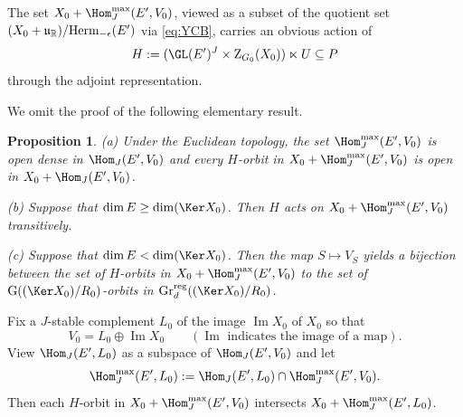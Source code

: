\documentclass[11pt,a4paper]{amsart}
\def\Im{\operatorname{Im}}
\newcommand{\R}{\mathbb R}
\newcommand{\la}{\langle}
\newcommand{\ra}{\rangle}
\newcommand{\be}{\begin {equation}}
\newcommand{\ee}{\end {equation}}
\numberwithin{equation}{section}
\newtheorem{prop}[thm]{Proposition}
\theoremstyle{remark}
\def\subset{\subseteq}
\begin{document}

The set $X_0+ \Hom_J^{\max}(E',V_0)$,  viewed as a subset of the  quotient set  $(X_0+\frak u_\R)/\mathrm{Herm}_{-\epsilon}(E')$ via \eqref{eq:YCB}, carries an obvious action of 
\[
H:= (\GL(E')^J\times \mathrm Z_{G_0}(X_0))\ltimes U\subset P
\]
through the adjoint representation. 




We omit the proof of the following elementary result. 
\begin{prop}\label{prop:A4}
 \noindent (a) Under the Euclidean topology, the set $\Hom_J^{\max}(E',V_0)$ is open dense in $\Hom_J(E',V_0)$  and  every $H$-orbit  in $X_0+\Hom_J^{\max}(E',V_0)$  is open in $X_0+\Hom_J(E',V_0)$. 
 
 \noindent (b) Suppose that $\dim E \geq \dim (\Ker X_0)$. Then $H$ acts on $X_0+\Hom_J^{\max}(E',V_0)$ transitively. 
 
 \noindent (c) Suppose that $\dim E < \dim (\Ker X_0)$. 
 Then the map $S\mapsto V_S$ yields a bijection between the set of $H$-orbits
 in $X_0+\Hom_J^{\max}(E',V_0)$ to the set of  $\mathrm{G}((\Ker X_0)/R_0)$-orbits in $\mathrm{Gr}_{d}^{\mathrm{reg}} ((\Ker X_0)/R_0)$. 


\end{prop}



Fix  a $J$-stable complement $L_0$ of the image $\Im X_0$ of $X_0$ so that
\begin{equation}\label{eq:L0}
V_0=L_0 \oplus \Im X_0\qquad (\textrm{$\Im$ indicates the image of a map}).
\end{equation}
View $\Hom_J(E',L_0)$ as a subspace of $\Hom_J(E',V_0)$ and 
let 
\[
\Hom_J^{\max}(E',L_0)  := \Hom_J(E',L_0) \cap  \Hom_J^{\max}(E',V_0) . 
\]
Then each $H$-orbit in  $X_0 + \Hom_J^{\max}(E',V_0)$ intersects 
$X_0 +\Hom_J^{\max}(E',L_0)$. 
\end{document}
